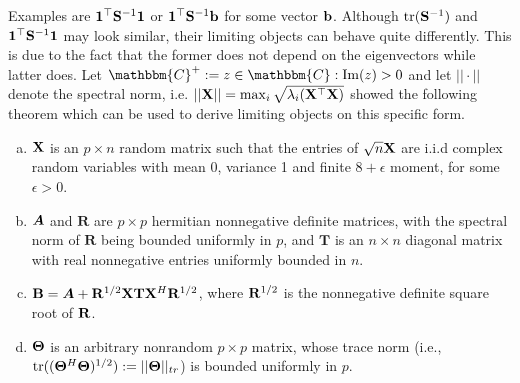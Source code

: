 \documentclass[12pt, oneside]{book}\usepackage{knitr}
\begin{document}
{Examples are $\mathbf{1}^\top \mathbf{S}^{-1} \mathbf{1}$ or $\mathbf{1}^\top \mathbf{S}^{-1} \mathbf{b}$ for some vector $\mathbf{b}$. 
Although $\operatorname{tr}(\mathbf{S}^{-1})$ and $\mathbf{1}^\top \mathbf{S}^{-1} \mathbf{1}$ may look similar, their limiting objects can behave quite differently. 
This is due to the fact that the former does not depend on the eigenvectors while latter does.
Let $\mathbbm{C}^+ := {z \in \mathbbm{C}: \operatorname{Im}(z)>0}$ and let $||\cdot||$ denote the spectral norm, i.e. $|| \mathbf{X} || =\max_i \sqrt{\lambda_{i}(\mathbf{X}^\top \mathbf{X})}$
\citet{rubio2011spectral} showed the following theorem which can be used to derive limiting objects on this specific form.
\begin{theorem}\label{thm:rubio}


\begin{enumerate}[(a)]
  \item \label{enum:1} $\mathbf{X}$ is an $p \times n$ random matrix such that the entries of $\sqrt{n}\mathbf{X}$ are i.i.d complex random variables with mean 0, variance 1 and finite $8+\epsilon$ moment, for some $\epsilon > 0$.
  \item \label{enum:2} $\mbox{\boldmath$A$}$ and $\mathbf{R}$ are $p \times p$ hermitian nonnegative definite matrices, with the spectral norm of $\mathbf{R}$ being bounded uniformly in $p$, and $\mathbf{T}$ is an $n \times n$ diagonal matrix with real nonnegative entries uniformly bounded in $n$.
  \item \label{enum:3} $\mathbf{B}=\mbox{\boldmath$A$} + \mathbf{R}^{1/2} \mathbf{X} \mathbf{T} \mathbf{X}^H \mathbf{R}^{1/2}$, where $\mathbf{R}^{1/2}$ is the nonnegative definite square root of $\mathbf{R}$.
  \item \label{enum:4} $\mathbf{\Theta}$ is an arbitrary nonrandom $p \times p$ matrix, whose trace norm (i.e., $\operatorname{tr}((\mathbf{\Theta}^H \mathbf{\Theta})^{1/2}):=||\mathbf{\Theta}||_{tr}$) is bounded uniformly in $p$.
\end{enumerate}


\end{theorem}}
\end{document}
